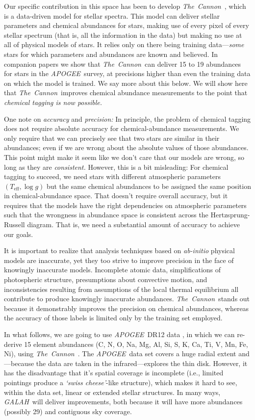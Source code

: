 \documentclass[12pt, letterpaper, preprint]{aastex}
\newcommand{\acronym}[1]{{\small{#1}}}
\newcommand{\project}[1]{\textsl{#1}}
\newcommand{\apogee}{\project{\acronym{APOGEE}}}
\newcommand{\galah}{\project{\acronym{GALAH}}}
\newcommand{\thecannon}{\project{The~Cannon}}
\newcommand{\foreign}[1]{\textsl{#1}}
\newcommand{\teff}{T_{\mathrm{eff}}}
\newcommand{\logg}{\log g}
\begin{document}
Our specific contribution in this space has been to develop
\thecannon\ \citep{thecannon, ages}, which is a data-driven model for
stellar spectra.
This model can deliver stellar parameters and chemical abundances for
stars, making use of every pixel of every stellar spectrum (that is,
all the information in the data) but making no use at all of physical
models of stars.
It relies only on there being training data---\emph{some} stars for
which parameters and abundances are known and believed.
In companion papers \citep{casey16, ness16} we show that
\thecannon\ can deliver 15 to 19 abundances for stars in the
\apogee\ survey, at precisions higher than even the training data on
which the model is trained.
We say more about this below.
We will show here that \thecannon\ improves chemical abundance measurements
to the point that \emph{chemical tagging is now possible.}

One note on \emph{accuracy} and \emph{precision:}
In principle, the problem of chemical tagging does not require
absolute accuracy for chemical-abundance measurements.
We only require that we can precisely see that two stars are similar
in their abundances; even if we are wrong about the absolute values of
those abundances.
This point might make it seem like we don't care that our models are
wrong, so long as they are \emph{consistent.}
However, this is a bit misleading:
For chemical tagging to succeed, we need stars with different
atmospheric parameters $(\teff, \logg)$ but the same chemical
abundances to be assigned the same position in chemical-abundance
space.
That doesn't require overall accuracy, but it requires that the models
have the right dependencies on atmospheric parameters such that the
wrongness in abundance space is consistent across the Hertzsprung-Russell diagram.
That is, we need a substantial amount of accuracy to achieve our goals.

It is important to realize that analysis techniques based on \foreign{ab-initio}
physical models are inaccurate, yet they too strive to improve precision
in the face of knowingly inaccurate models.  Incomplete atomic data, 
simplifications of photospheric structure, presumptions about convective
motion, and inconsistencies resulting from assumptions of the local thermal
equilibrium all contribute to produce knowingly inaccurate abundances.
\thecannon\ stands out because it demonstrably improves the precision on
chemical abundances, whereas the accuracy of those labels is limited only
by the training set employed.

In what follows, we are going to use \apogee\ \acronym{DR12} data \citep{dr12}, in
which we can re-derive 15 element abundances (C, N, O, Na, Mg, Al, Si,
S, K, Ca, Ti, V, Mn, Fe, Ni), using \thecannon\ \citep{thecannon}.
The \apogee\ data set covers a huge radial extent and---because the
data are taken in the infrared---explores the thin disk.
However, it has the disadvantage that it's spatial coverage is incomplete
(i.e., limited pointings produce a \foreign{`swiss cheese'}-like structure),
which makes it hard to see, within the data set, linear or
extended stellar structures.
In many ways, \galah\ will deliver improvements, both because it will
have more abundances (possibly 29) and contiguous sky coverage.
\end{document}
